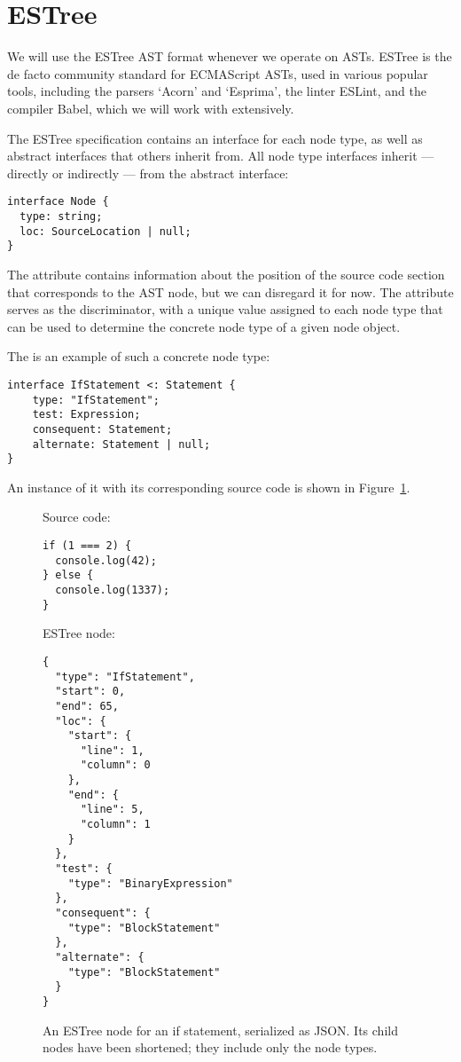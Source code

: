 \section{ESTree}
We will use the ESTree AST format whenever we operate on ASTs.
ESTree is the de facto community standard for ECMAScript ASTs,
used in various popular tools, including
the parsers `Acorn' and `Esprima',
the linter ESLint, and
the compiler Babel,
which we will work with extensively.
\autocite{EstreeSpec}

The ESTree specification contains an interface for each node type,
as well as abstract interfaces that others inherit from.
All node type interfaces inherit --- directly or indirectly ---
from the abstract  interface: \autocite{EstreeSpec}
\begin{verbatim}
interface Node {
  type: string;
  loc: SourceLocation | null;
}
\end{verbatim}
The  attribute contains information about
the position of the source code section
that corresponds to the AST node,
but we can disregard it for now.
The  attribute serves as the discriminator,
with a unique value assigned to each node type
that can be used to determine
the concrete node type of a given node object.

The  is an example
of such a concrete node type:
\autocite{EstreeSpec}
\begin{verbatim}
interface IfStatement <: Statement {
    type: "IfStatement";
    test: Expression;
    consequent: Statement;
    alternate: Statement | null;
}
\end{verbatim}
An instance of it
with its corresponding source code
is shown in Figure~\ref{fig:EstreeIfStmt}.
\begin{figure}
  Source code:
  \begin{verbatim}
if (1 === 2) {
  console.log(42);
} else {
  console.log(1337);
}
  \end{verbatim}
	ESTree node:
  \begin{verbatim}
{
  "type": "IfStatement",
  "start": 0,
  "end": 65,
  "loc": {
    "start": {
      "line": 1,
      "column": 0
    },
    "end": {
      "line": 5,
      "column": 1
    }
  },
  "test": {
    "type": "BinaryExpression"
  },
  "consequent": {
    "type": "BlockStatement"
  },
  "alternate": {
    "type": "BlockStatement"
  }
}
  \end{verbatim}
  \caption{
    An ESTree node for an if statement, serialized as JSON.
    Its child nodes have been shortened; they include only the node types.
  }\label{fig:EstreeIfStmt}
\end{figure}
